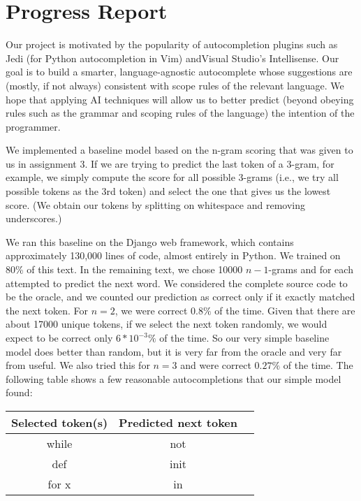 \documentclass[10.75pt]{article}
\begin{document}
\maketitle

\section{Progress Report}


Our project is motivated by the popularity of autocompletion plugins such as Jedi (for Python autocompletion in Vim)\cite{jedi} andVisual Studio's Intellisense. Our goal is to build a smarter, language-agnostic autocomplete whose suggestions are (mostly, if not always) consistent with scope rules of the relevant language. We hope that applying AI techniques will allow us to better predict (beyond obeying rules such as the grammar and scoping rules of the language) the intention of the programmer. 

We implemented a baseline model based on the n-gram scoring that was given to us in assignment 3. If we are trying to predict the last token of a 3-gram, for example, we simply compute the score for all possible 3-grams (i.e., we try all possible tokens as the 3rd token) and select the one that gives us the lowest score. (We obtain our tokens by splitting on whitespace and removing underscores.) 

We ran this baseline on the Django web framework, which contains approximately 130,000 lines of code, almost entirely in Python. We trained on 80\% of this text.  In the remaining text, we chose 10000 $n-1$-grams and for each attempted to predict the next word. We considered the complete source code to be the oracle, and we counted our prediction as correct only if it exactly matched the next token. For $n=2$, we were correct $0.8\%$ of the time.  Given that there are about 17000 unique tokens, if we select the next token randomly, we would expect to be correct only  $6*10^{-3}\%$ of the time. So our very simple baseline model does better than random, but it is very far from the oracle and very far from useful. We also tried this for $n=3$ and were correct $0.27\%$ of the time. The following table shows a few reasonable autocompletions that our simple model found:
\\

 \begin{tabular}{c c c} 
Selected token(s) & Predicted next token & \\
\hline %
while & not\\ %
def & init\\
for x & in\\
\end{tabular}\\\\
\end{document}

